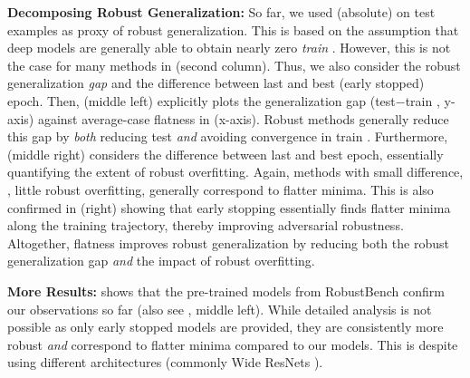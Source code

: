 \textbf{Decomposing Robust Generalization:}
%
So far, we used (absolute) \RCE on test examples as proxy of robust generalization. This is based on the assumption that deep models are generally able to obtain nearly zero \emph{train} \RCE. However, this is not the case for many methods in  (second column). Thus, we also consider the robust generalization \emph{gap} and the \RCE difference between last and best (early stopped) epoch.  Then,  (middle left) explicitly plots the \RCE generalization gap (test$-$train \RCE, y-axis) against average-case flatness in \RCE (x-axis). Robust methods generally reduce this gap by \emph{both} reducing test \RCE \emph{and} avoiding convergence in train \RCE. Furthermore,  (middle right) considers the difference between last and best epoch, essentially quantifying the extent of robust overfitting. Again, methods with small difference, \ie, little robust overfitting, generally correspond to flatter minima. This is also confirmed in  (right) showing that early stopping essentially finds flatter minima along the training trajectory, thereby improving adversarial robustness.
Altogether, flatness improves robust generalization by reducing both the robust generalization gap \emph{and} the impact of robust overfitting.

\textbf{More Results:}  shows that the pre-trained models from RobustBench \cite{CroceARXIV2020b} confirm our observations so far (also see , middle left). While detailed analysis is not possible as only early stopped models are provided, they are consistently more robust \emph{and} correspond to flatter minima compared to our models. This is despite using different architectures (commonly Wide ResNets \cite{ZagoruykoBMVC2016}).